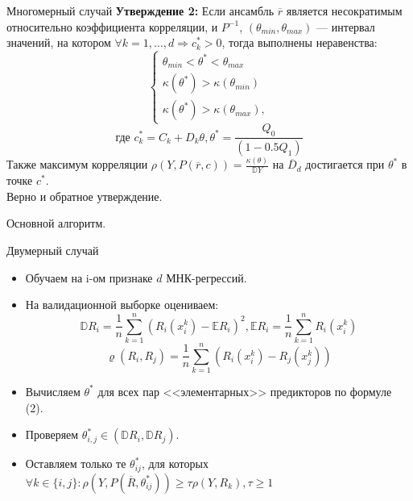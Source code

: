 \documentclass{beamer}
\begin{document}
\begin{frame}{Многомерный случай}
\textbf{Утверждение 2:} Если ансамбль $\overline{r}$ является несократимым относительно коэффициента корреляции, и \exists $P^{-1}$, $(\theta_{min}, \theta_{max})$ — интервал значений, на котором $\forall k = 1, \dots, d \Rightarrow c^*_k > 0$, тогда выполнены неравенства: \\
$$
\begin{cases}
    \theta_{min} < \theta^* < \theta_{max} \\
    \kappa(\theta^*) > \kappa(\theta_{min}) \\ 
    \kappa(\theta^*) > \kappa(\theta_{max}), 
\end{cases}
$$
$$\text{где } c_k^* = C_k + D_k \theta, \theta^* = \frac{Q_0}{(1- 0.5 Q_1)}$$
Также максимум корреляции $\rho(Y, P(\overline{r}, c)) = \frac{\kappa(\theta)}{\mathbb{D}Y}$ на $\overline{D}_d$ достигается при $\theta^*$ в точке $c^*$. \\
Верно и обратное утверждение.
\end{frame}
\begin{frame}{Основной алгоритм.}
\begin{block}{Двумерный случай}
    \begin{itemize}
    \item Обучаем на i-ом признаке $d$ МНК-регрессий.
    \item На валидационной выборке оцениваем: $$
    \mathbb{D}R_i = \frac{1}{n} \sum_{k=1}^n (R_i(x^k_i) - \mathbb{E}R_i)^2, \mathbb{E}R_i = \frac{1}{n} \sum_{k=1}^n R_i(x^k_i)$$
    $$
    \varrho(R_{i}, R_{j}) = \frac{1}{n} \sum_{k=1}^n (R_i(x^k_i) - R_j(x^k_j))
    $$
    \item Вычисляем $\theta^*$ для всех пар <<элементарных>> предикторов по формуле (2).
    \item Проверяем $\theta^*_{i,j} \in (\mathbb{D}R_i, \mathbb{D}R_j)$.
    \item Оставляем только те $\theta^*_{ij}$, для которых $\forall k \in \{i, j\}: \rho(Y, P(\overline{R}, \theta_{ij}^*)) \geq \tau \rho(Y, R_k), \tau \geq 1$
\end{itemize}
\end{block}
\end{frame}
\end{document}
